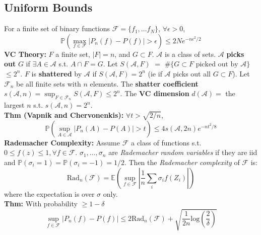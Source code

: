 \documentclass[10pt,twocolumn]{article}
\begin{document}
\subsection*{Uniform Bounds}
    For a finite set of binary functions $\mathcal{F} = \{ f_1, \ldots f_N \}$, $\forall \epsilon>0$,
    \begin{equation}
        \mathbb{P}\left( \max_{f \in \mathcal{F}} |P_n(f) - P(f)| > \epsilon \right) 
        \leq 2Ne^{-n\epsilon^2/2}
    \end{equation}
    \textbf{VC Theory:}
    $F$ a finite set, $|F| = n$, and $G \subset F$. $\mathcal{A}$ is a class of sets.
    $\mathcal{A}$ \textbf{picks out} $G$ if $\exists A \in \mathcal{A}$ s.t. $A \cap F = G$.
    Let $S(\mathcal{A},F)$ $=$ $\#\{G \subset F \text{ picked out by } \mathcal{A}\}$ $\leq 2^{n}$.
    $F$ is \textbf{shattered} by $\mathcal{A}$ if $S(\mathcal{A},F) = 2^{n}$ (ie if $\mathcal{A}$ picks out all $G \subset F$).
    Let $\mathcal{F}_{n}$ be all finite sets with $n$ elements.
    The \textbf{shatter coefficient} $s(\mathcal{A},n) = \sup_{F \in \mathcal{F}_{n}} S(\mathcal{A},F) \leq 2^{n}$.
    The \textbf{VC dimension} $d(\mathcal{A}) =$ the largest $n$ s.t. $s(\mathcal{A},n) = 2^{n}$.\\
    \textbf{Thm (Vapnik and Chervonenkis):} $\forall t>\sqrt{2/n}$, 
    \begin{equation}
        \mathbb{P} \left( \sup_{A \in \mathcal{A}} |P_{n}(A) - P(A)| > t \right) \leq 4 s(\mathcal{A},2n)e^{-nt^{2}/8}
    \end{equation}
    \textbf{Rademacher Complexity:} Assume $\mathcal{F}$ a class of functions s.t. $0 \leq f(z) \leq 1, \forall f \in \mathcal{F}$.
    $\sigma_1,\ldots,\sigma_n$ are \emph{Rademacher random variables} if they are iid and $\mathbb{P}(\sigma_i=1) = \mathbb{P}(\sigma_i=-1) = 1/2$.
    Then the \emph{Rademacher complexity} of $\mathcal{F}$ is:
    \begin{equation}
        \text{Rad}_n(\mathcal{F}) = \mathbb{E} \left( \sup_{f \in \mathcal{F}} \left| \frac{1}{n} \sum_i \sigma_i f(Z_i)  \right|  \right)
    \end{equation}
    where the expectation is over $\sigma$ only.\\
    \textbf{Thm:} With probability $\geq 1-\delta$
    \begin{equation}
        \sup_{f \in \mathcal{F}} \left| P_n(f) - P(f)  \right|
            \leq 2\text{Rad}_n(\mathcal{F}) + \sqrt{\frac{1}{2n} \text{log} \left( \frac{2}{\delta} \right)}
    \end{equation}
\end{document}
